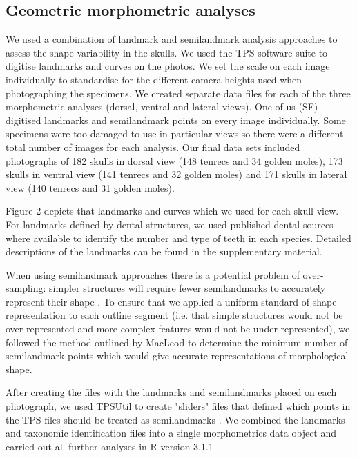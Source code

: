 \documentclass[12pt,a4paper]{article}
\begin{document}
\subsection{Geometric morphometric analyses}

	We used a combination of landmark and semilandmark analysis approaches to assess the shape variability in the skulls.  We used the TPS software suite \citep{Rohlf2013} to digitise landmarks and curves on the photos. We set the scale on each image individually to standardise for the different camera heights used when photographing the specimens. We created separate data files for each of the three morphometric analyses (dorsal, ventral and lateral views). One of us (SF) digitised landmarks and semilandmark points on every image individually. Some specimens were too damaged to use in particular views so there were a different total number of images for each analysis. Our final data sets included photographs of 182 skulls in dorsal view (148 tenrecs and 34 golden moles), 173 skulls in ventral view (141 tenrecs and 32 golden moles) and 171 skulls in lateral view (140 tenrecs and 31 golden moles).

	Figure 2 depicts that landmarks and curves which we used for each skull view. For landmarks defined by dental structures, we used published dental sources \citep{Repenning1967, Eisenberg1969, Nowak1983, MacPhee1987, KnoxJones1992, Davis1997, Querouil2001, Nagorsen2002, Wilson2005, Goodman2006, Karatas2007, Hoffmann2008, Asher2008,  Muldoon2009, Lin2010} where available to identify the number and type of teeth in each species. Detailed descriptions of the landmarks can be found in the supplementary material.

	When using semilandmark approaches there is a potential problem of over-sampling: simpler structures will require fewer semilandmarks to accurately represent their shape \citep{MacLeod2012}. To ensure that we applied a uniform standard of shape representation to each outline segment (i.e. that simple structures would not be over-represented and more complex features would not be under-represented), we followed the method outlined by MacLeod \citeyearpar{MacLeod2012} to determine the minimum number of semilandmark points which would give accurate representations of morphological shape.
	
	After creating the files with the landmarks and semilandmarks placed on each photograph, we used TPSUtil \citep{Rohlf2012} to create "sliders" files that defined which points in the TPS files should be treated as semilandmarks \citep{Zelditch2012}. We combined the landmarks and taxonomic identification files into a single morphometrics data object and carried out all further analyses in R version 3.1.1 \citep{Team2014}. 
	
\end{document}
